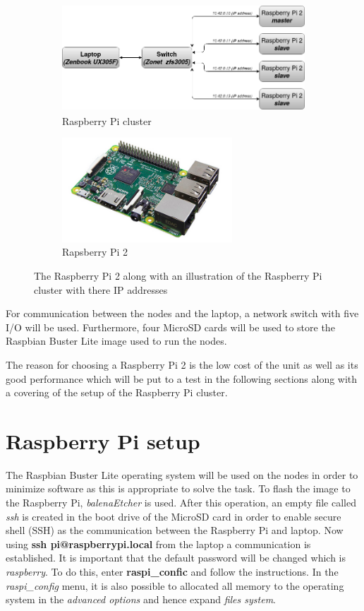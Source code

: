 \documentclass[../Head/Report.tex]{subfiles}
\begin{document}
\begin{figure}[H]
\centering
  \begin{subfigure}[b]{0.59\textwidth}
  \centering
    \includegraphics[height=4cm]{../Figures/cluster.png}
    \caption{Raspberry Pi cluster}
    \label{fig:cluster}
  \end{subfigure}
  \hfill
  \begin{subfigure}[b]{0.40\textwidth}
  \centering
    \includegraphics[height=3.9cm]{../Figures/raspberry_pi.png}
    \caption{Rapsberry Pi 2}
    \label{fig:raspberry_pi}
  \end{subfigure}
  \caption{The Raspberry Pi 2 along with an illustration of the Raspberry Pi cluster with there IP addresses}
\end{figure}
    
For communication between the nodes and the laptop, a network switch with five I/O will be used. Furthermore, four MicroSD cards will be used to store the Raspbian Buster Lite image used to run the nodes. 

The reason for choosing a Raspberry Pi 2 is the low cost of the unit as well as its good performance which will be put to a test in the following sections along with a covering of the setup of the Raspberry Pi cluster.   

\section{Raspberry Pi setup}
	
The Raspbian Buster Lite operating system will be used on the nodes in order to minimize software as this is appropriate to solve the task. To flash the image to the Raspberry Pi, \textit{balenaEtcher} is used. After this operation, an empty file called \textit{ssh} is created in the boot drive of the MicroSD card in order to enable secure shell (SSH) as the communication between the Raspberry Pi and laptop. Now using \textbf{ssh pi@raspberrypi.local} from the laptop a communication is established. It is important that the default password will be changed which is \textit{raspberry}. To do this, enter \textbf{raspi\_confic} and follow the instructions. In the \textit{raspi\_config} menu, it is also possible to allocated all memory to the operating system in the \textit{advanced options} and hence expand \textit{files system}.   
\end{document}
